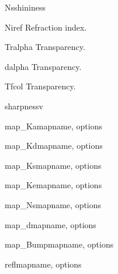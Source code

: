 \begin{methoddesc}{Ns}{shininess}
\end{methoddesc}

\begin{methoddesc}{Ni}{ref}
Refraction index.
\end{methoddesc}

\begin{methoddesc}{Tr}{alpha}
Transparency.
\end{methoddesc}

\begin{methoddesc}{d}{alpha}
Transparency.
\end{methoddesc}

\begin{methoddesc}{Tf}{col}
Transparency.
\end{methoddesc}

\begin{methoddesc}{sharpness}{v}
\end{methoddesc}

\begin{methoddesc}{map_Ka}{mapname, options}
\end{methoddesc}

\begin{methoddesc}{map_Kd}{mapname, options}
\end{methoddesc}

\begin{methoddesc}{map_Ks}{mapname, options}
\end{methoddesc}

\begin{methoddesc}{map_Ke}{mapname, options}
\end{methoddesc}

\begin{methoddesc}{map_Ns}{mapname, options}
\end{methoddesc}

\begin{methoddesc}{map_d}{mapname, options}
\end{methoddesc}

\begin{methoddesc}{map_Bump}{mapname, options}
\end{methoddesc}

\begin{methoddesc}{refl}{mapname, options}
\end{methoddesc}


